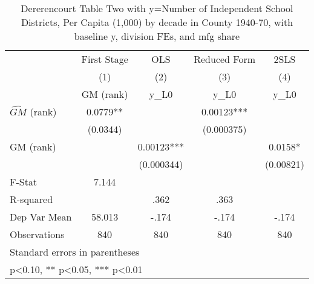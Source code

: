 \begin{table}[htbp]\centering
\def\sym#1{\ifmmode^{#1}\else\(^{#1}\)\fi}
\caption{Dererencourt Table Two with y=Number of Independent School Districts, Per Capita (1,000) by decade in County 1940-70, with baseline y, division FEs, and mfg share}
\begin{tabular}{l*{4}{c}}
\toprule
                    & First Stage   &         OLS   &Reduced Form   &        2SLS   \\
                    &\multicolumn{1}{c}{(1)}&\multicolumn{1}{c}{(2)}&\multicolumn{1}{c}{(3)}&\multicolumn{1}{c}{(4)}\\
                    &\multicolumn{1}{c}{GM  (rank)}&\multicolumn{1}{c}{y\_L0}&\multicolumn{1}{c}{y\_L0}&\multicolumn{1}{c}{y\_L0}\\
\midrule
$\hat{GM}$ (rank)   &      0.0779** &               &     0.00123***&               \\
                    &    (0.0344)   &               &  (0.000375)   &               \\
\addlinespace
GM  (rank)          &               &     0.00123***&               &      0.0158*  \\
                    &               &  (0.000344)   &               &   (0.00821)   \\
\midrule
F-Stat              &       7.144   &               &               &               \\
R-squared           &               &        .362   &        .363   &               \\
Dep Var Mean        &      58.013   &       -.174   &       -.174   &       -.174   \\
Observations        &         840   &         840   &         840   &         840   \\
\bottomrule
\multicolumn{5}{l}{\footnotesize Standard errors in parentheses}\\
\multicolumn{5}{l}{\footnotesize * p<0.10, ** p<0.05, *** p<0.01}\\
\end{tabular}
\end{table}
